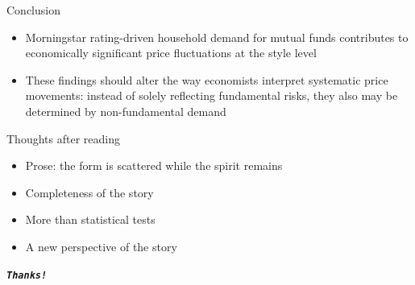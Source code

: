 \documentclass[UTF8, 16pt]{beamer}
\begin{document}
\begin{CJK*}{UTF8}{gbsn}
\begin{frame}{Conclusion}
	\begin{itemize}
		\item Morningstar rating-driven household demand for mutual funds contributes to economically significant price fluctuations at the style level
		\item These findings should alter the way economists interpret systematic price movements: instead of solely reflecting fundamental risks, they also may be determined by \alert{non-fundamental demand}
	\end{itemize}
\end{frame}

\begin{frame}{Thoughts after reading}
	\begin{itemize}
		\item Prose: the form is scattered while the spirit remains
		\item Completeness of the story
		\item More than statistical tests
		\item A new perspective of the story
	\end{itemize}
\end{frame}

\begin{frame}[allowframebreaks]%
	\begin{center}
		\Huge\textbf{\textit{\texttt{Thanks!}}}
	\end{center}
\end{frame}




\end{CJK*}
\end{document}

